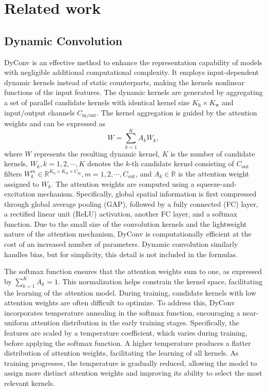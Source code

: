 \section{Related work \label{sec2}
}
\subsection{Dynamic Convolution \label{sec2.1}}
DyConv \cite{chen2020dynamic} is an effective method to enhance the representation capability of models with negligible additional computational complexity. It employs input-dependent dynamic kernels instead of static counterparts, making the kernels nonlinear functions of the input features. The dynamic kernels are generated by aggregating a set of parallel candidate kernels with identical kernel size $K_\text{h} \times K_\text{w}$ and input/output channels  $C_{\text{in/out}}$. The kernel aggregation is guided by the attention weights and can be expressed as
\begin{equation}
    W = \sum_{k=1}^{K} A_k W_k,
    \label{eq.1}
\end{equation}
where $W$ represents the resulting dynamic kernel, $K$ is the number of candidate kernels, $W_k, k=1,2,\cdots,K$ denotes the $k$-th candidate kernel consisting of $C_{\text{out}}$ filters $W_k^m \in \mathbb{R}^{K_\text{h} \times K_\text{w} \times C_{\text{in}}}, m=1,2,\cdots,C_{\text{out}}$, and $A_k \in \mathbb{R}$ is the attention weight assigned to $W_k$. The attention weights are computed using a squeeze-and-excitation mechanism. Specifically, global spatial information is first compressed through global average pooling (GAP), followed by a fully connected (FC) layer, a rectified linear unit (ReLU) activation, another FC layer, and a softmax function. Due to the small size of the convolution kernels and the lightweight nature of the attention mechanism, DyConv is computationally efficient at the cost of an increased number of parameters. Dynamic convolution similarly handles bias, but for simplicity, this detail is not included in the formulas.

The softmax function ensures that the attention weights sum to one, as expressed by $\sum_{k=1}^{K} A_k = 1$. This normalization helps constrain the kernel space, facilitating the learning of the attention model. During training, candidate kernels with low attention weights are often difficult to optimize. To address this, DyConv incorporates temperature annealing in the softmax function, encouraging a near-uniform attention distribution in the early training stages. Specifically, the features are scaled by a temperature coefficient, which varies during training, before applying the softmax function. A higher temperature produces a flatter distribution of attention weights, facilitating the learning of all kernels. As training progresses, the temperature is gradually reduced, allowing the model to assign more distinct attention weights and improving its ability to select the most relevant kernels.

